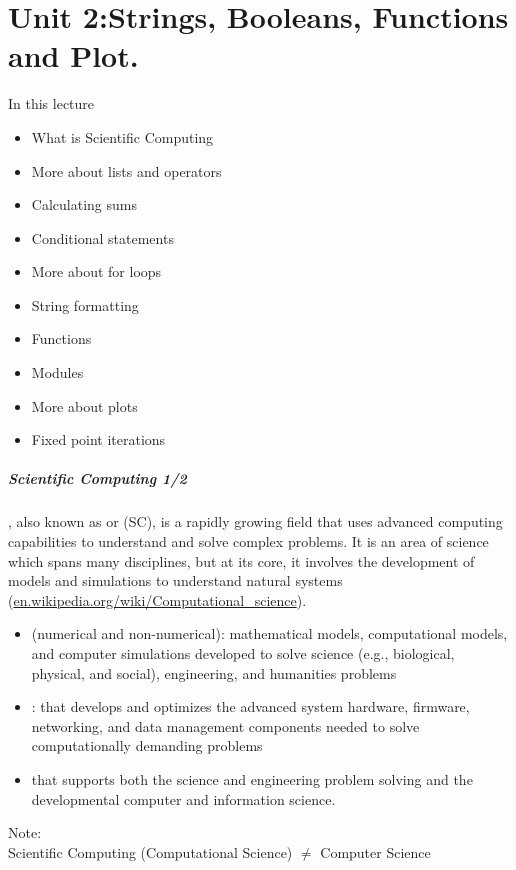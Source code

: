 \documentclass[hyperref={pdfpagelabels=false},table, handout]{beamer}
\begin{document}
\part{Unit 2:Strings, Booleans, Functions and Plot.}


\begin{frame}[fragile]{In this lecture}

\begin{itemize}
  \item What is Scientific Computing
  \item More about lists and operators
  \item Calculating sums
  \item Conditional statements
  \item More about for loops
  \item String formatting
  \item Functions
  \item Modules
  \item More about plots
  \item Fixed point iterations
\end{itemize}
\end{frame}

\begin{frame}\frametitle{Scientific Computing 1/2}

  \small

  , also known as  or  (SC),
  is a rapidly growing field that uses advanced computing capabilities to understand and solve complex problems.
  It is an area of science which spans many disciplines, but at its core,
  it involves the development of models and simulations to understand natural systems (\url{en.wikipedia.org/wiki/Computational_science}). \\

  \vskip 5pt

  \begin{itemize}
    \item {} (numerical and non-numerical): mathematical models, computational models, and computer simulations developed to solve science (e.g., biological, physical, and social), engineering, and humanities problems
    \item {}: that develops and optimizes the advanced system hardware, firmware, networking, and data management components needed to solve computationally demanding problems
    \item {} that supports both the science and engineering problem solving and the developmental computer and information science.  \\
  \end{itemize}

  \alert{Note}: \\
  Scientific Computing (Computational Science) $\neq$ Computer Science
\end{frame}
\end{document}
